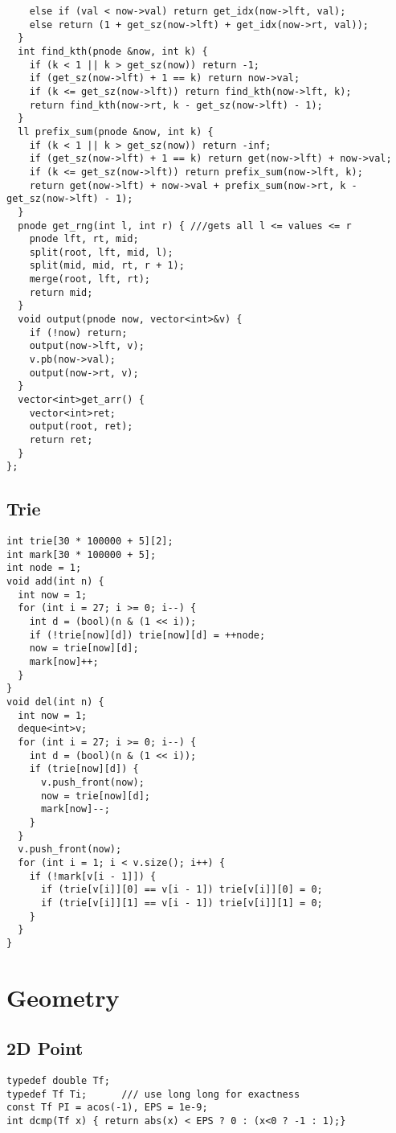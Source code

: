 \documentclass[10pt,a4paper,onesided]{article}
\begin{document}
\begin{multicols*}{3}
\begin{lstlisting}
    else if (val < now->val) return get_idx(now->lft, val);
    else return (1 + get_sz(now->lft) + get_idx(now->rt, val));
  }
  int find_kth(pnode &now, int k) {
    if (k < 1 || k > get_sz(now)) return -1;
    if (get_sz(now->lft) + 1 == k) return now->val;
    if (k <= get_sz(now->lft)) return find_kth(now->lft, k);
    return find_kth(now->rt, k - get_sz(now->lft) - 1);
  }
  ll prefix_sum(pnode &now, int k) {
    if (k < 1 || k > get_sz(now)) return -inf;
    if (get_sz(now->lft) + 1 == k) return get(now->lft) + now->val;
    if (k <= get_sz(now->lft)) return prefix_sum(now->lft, k);
    return get(now->lft) + now->val + prefix_sum(now->rt, k - get_sz(now->lft) - 1);
  }
  pnode get_rng(int l, int r) { ///gets all l <= values <= r
    pnode lft, rt, mid;
    split(root, lft, mid, l);
    split(mid, mid, rt, r + 1);
    merge(root, lft, rt);
    return mid;
  }
  void output(pnode now, vector<int>&v) {
    if (!now) return;
    output(now->lft, v);
    v.pb(now->val);
    output(now->rt, v);
  }
  vector<int>get_arr() {
    vector<int>ret;
    output(root, ret);
    return ret;
  }
};
\end{lstlisting}
\subsection{Trie}
\begin{lstlisting}
int trie[30 * 100000 + 5][2];
int mark[30 * 100000 + 5];
int node = 1;
void add(int n) {
  int now = 1;
  for (int i = 27; i >= 0; i--) {
    int d = (bool)(n & (1 << i));
    if (!trie[now][d]) trie[now][d] = ++node;
    now = trie[now][d];
    mark[now]++;
  }
}
void del(int n) {
  int now = 1;
  deque<int>v;
  for (int i = 27; i >= 0; i--) {
    int d = (bool)(n & (1 << i));
    if (trie[now][d]) {
      v.push_front(now);
      now = trie[now][d];
      mark[now]--;
    }
  }
  v.push_front(now);
  for (int i = 1; i < v.size(); i++) {
    if (!mark[v[i - 1]]) {
      if (trie[v[i]][0] == v[i - 1]) trie[v[i]][0] = 0;
      if (trie[v[i]][1] == v[i - 1]) trie[v[i]][1] = 0;
    }
  }
}
\end{lstlisting}
\section{Geometry}
\subsection{2D Point}
\begin{lstlisting}
typedef double Tf;
typedef Tf Ti;      /// use long long for exactness
const Tf PI = acos(-1), EPS = 1e-9;
int dcmp(Tf x) { return abs(x) < EPS ? 0 : (x<0 ? -1 : 1);}


\end{lstlisting}
\end{multicols*}
\end{document}
